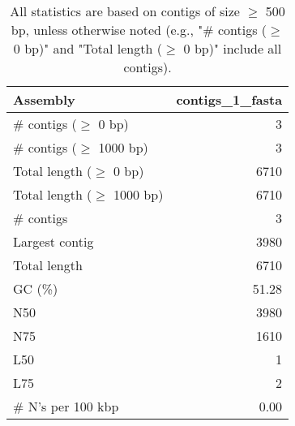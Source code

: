 \documentclass[12pt,a4paper]{article}
\begin{document}
\begin{table}[ht]
\begin{center}
\caption{All statistics are based on contigs of size $\geq$ 500 bp, unless otherwise noted (e.g., "\# contigs ($\geq$ 0 bp)" and "Total length ($\geq$ 0 bp)" include all contigs).}
\begin{tabular}{|l*{1}{|r}|}
\hline
Assembly & contigs\_1\_fasta \\ \hline
\# contigs ($\geq$ 0 bp) & 3 \\ \hline
\# contigs ($\geq$ 1000 bp) & 3 \\ \hline
Total length ($\geq$ 0 bp) & 6710 \\ \hline
Total length ($\geq$ 1000 bp) & 6710 \\ \hline
\# contigs & 3 \\ \hline
Largest contig & 3980 \\ \hline
Total length & 6710 \\ \hline
GC (\%) & 51.28 \\ \hline
N50 & 3980 \\ \hline
N75 & 1610 \\ \hline
L50 & 1 \\ \hline
L75 & 2 \\ \hline
\# N's per 100 kbp & 0.00 \\ \hline
\end{tabular}
\end{center}
\end{table}
\end{document}
